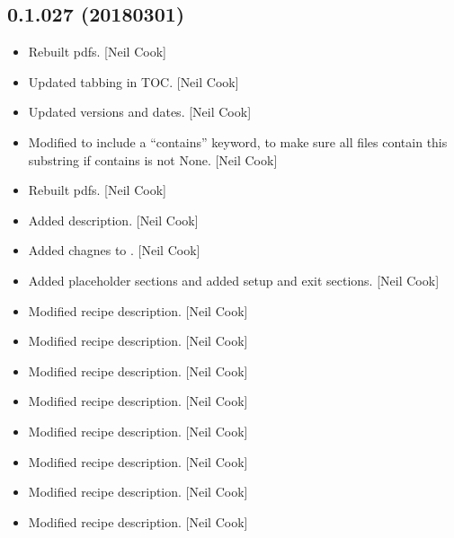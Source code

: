 \documentclass[a4paper,10pt,english]{report}
\begin{document}
\subsection{0.1.027 (2018\sphinxhyphen{}03\sphinxhyphen{}01)}
\label{\detokenize{misc/changelog:id495}}\begin{itemize}
\item {} 
Rebuilt pdfs. {[}Neil Cook{]}

\item {} 
Updated tabbing in TOC. {[}Neil Cook{]}

\item {} 
Updated versions and dates. {[}Neil Cook{]}

\item {} 
Modified  to include a “contains” keyword, to make
sure all files  contain this substring if contains is
not None. {[}Neil Cook{]}

\item {} 
Rebuilt pdfs. {[}Neil Cook{]}

\item {} 
Added description. {[}Neil Cook{]}

\item {} 
Added chagnes to . {[}Neil Cook{]}

\item {} 
Added placeholder sections and added setup and exit sections. {[}Neil
Cook{]}

\item {} 
Modified recipe description. {[}Neil Cook{]}

\item {} 
Modified recipe description. {[}Neil Cook{]}

\item {} 
Modified recipe description. {[}Neil Cook{]}

\item {} 
Modified recipe description. {[}Neil Cook{]}

\item {} 
Modified recipe description. {[}Neil Cook{]}

\item {} 
Modified recipe description. {[}Neil Cook{]}

\item {} 
Modified recipe description. {[}Neil Cook{]}

\item {} 
Modified recipe description. {[}Neil Cook{]}


\end{itemize}
\end{document}
